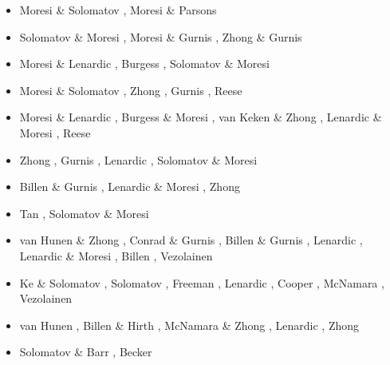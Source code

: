 \begin{itemize}
\begin{scriptsize}
\begin{itemize}
\item[\nineteenninetyfive] Moresi \& Solomatov \cite{moso95}, Moresi \& Parsons \cite{mopa95}
\item[\nineteenninetysix] Solomatov \& Moresi \cite{somo96}, Moresi \& Gurnis \cite{mogu96}, 
                    Zhong \& Gurnis \cite{zhgu96}
\item[\nineteenninetyseven] Moresi \& Lenardic \cite{mole97}, Burgess \etal \cite{bugm97}, 
                    Solomatov \& Moresi \cite{somo97}
\item[\nineteenninetyeight] Moresi \& Solomatov \cite{moso98}, Zhong \etal \cite{zhgm98}, 
                    Gurnis \etal \cite{gumm98}, Reese \etal \cite{resm98}
\item[\nineteenninetynine] Moresi \& Lenardic \cite{mole99}, Burgess \& Moresi \cite{bumo99}, 
                    van Keken \& Zhong \cite{vazh99}, Lenardic \& Moresi \cite{lemo99}, 
                    Reese \etal \cite{resm99}
\item[\twothousand] Zhong \etal \cite{zhzm00}, Gurnis \etal \cite{gumr00,gumm00},
                    Lenardic \etal \cite{lemm00}, Solomatov \& Moresi \cite{somo00}
\item[\twothousandone] Billen \& Gurnis \cite{bigu01}, Lenardic \& Moresi \cite{lemo01},
                    Zhong \cite{zhon01}
\item[\twothousandtwo] Tan \etal \cite{tagh02}, Solomatov \& Moresi \cite{somo02}
\item[\twothousandthree] van Hunen \& Zhong \cite{vazh03}, Conrad \& Gurnis \cite{cogu03},
                    Billen \& Gurnis \cite{bigu03}, Lenardic \etal \cite{lemm03},
                    Lenardic \& Moresi \cite{lemo03}, Billen \etal \cite{bigs03}, 
                    Vezolainen \etal \cite{vesh03}
\item[\twothousandfour] Ke \& Solomatov \cite{keso04}, Solomatov \cite{solo04},
                    Freeman \etal \cite{frmm04}, Lenardic \etal \cite{lenm04},
                    Cooper \etal \cite{colm04}, McNamara \etal \cite{mczh04}, 
                    Vezolainen \etal \cite{vesb04}
\item[\twothousandfive] van Hunen \etal \cite{vazs05}, Billen \& Hirth \cite{bihi05},
                    McNamara \& Zhong \cite{mczh05a}\cite{mczh05b},
                    Lenardic \etal \cite{lemj05}, Zhong \cite{zhon05}
\item[\twothousandsix] Solomatov \& Barr \cite{soba06}, Becker \cite{beck06}

\end{itemize}
\end{scriptsize}
\end{itemize}

